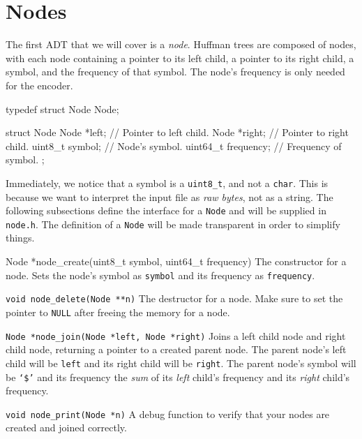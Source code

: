 \section{Nodes}

The first ADT that we will cover is a \emph{node}. Huffman trees
are composed of nodes, with each node containing a pointer to its left
child, a pointer to its right child, a symbol, and the frequency of that
symbol. The node's frequency is only needed for the encoder.

\begin{clisting}{}
typedef struct Node Node;

struct Node {
    Node *left;         // Pointer to left child.
    Node *right;        // Pointer to right child.
    uint8_t symbol;     // Node's symbol.
    uint64_t frequency; // Frequency of symbol.
};
\end{clisting}

Immediately, we notice that a symbol is a \texttt{uint8\_t}, and not a
\texttt{char}. This is because we want to interpret the input file as
\emph{raw bytes}, not as a string. The following subsections define the
interface for a \texttt{Node} and will be supplied in \texttt{node.h}.
The definition of a \texttt{Node} will be made transparent in order to
simplify things.

\begin{funcdoc}{Node *node\_create(uint8\_t symbol, uint64\_t frequency)}
  The constructor for a node. Sets the node's symbol as \texttt{symbol}
  and its frequency as \texttt{frequency}.
\end{funcdoc}

\begin{funcdoc}{\texttt{void node\_delete(Node **n)}}
  The destructor for a node. Make sure to set the pointer to
  \texttt{NULL} after freeing the memory for a node.
\end{funcdoc}

\begin{funcdoc}{\texttt{Node *node\_join(Node *left, Node *right)}}
  Joins a left child node and right child node, returning a pointer to a
  created parent node. The parent node's left child will be
  \texttt{left} and its right child will be \texttt{right}. The parent
  node's symbol will be \texttt{`\$'} and its frequency the \emph{sum}
  of its \emph{left} child's frequency and its \emph{right} child's
  frequency.
\end{funcdoc}

\begin{funcdoc}{\texttt{void node\_print(Node *n)}}
A debug function to verify that your nodes are created and joined
correctly.
\end{funcdoc}
